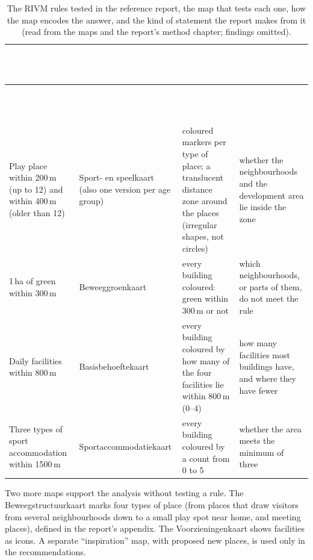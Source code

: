 \begingroup\renewcommand{\arraystretch}{1.3}
\begin{longtable}{|>{\raggedright\arraybackslash}p{3.3cm}|>{\raggedright\arraybackslash}p{2.9cm}|>{\raggedright\arraybackslash}p{4.4cm}|>{\raggedright\arraybackslash}p{3.6cm}|}
\caption{The RIVM rules tested in the reference report, the map that tests each one, how the map encodes the answer, and the kind of statement the report makes from it (read from the maps and the report's method chapter; findings omitted).}\label{tab:rules-maps}\\
\hline
\cellcolor{navy}\textcolor{white}{\textbf{RIVM rule}} & \cellcolor{navy}\textcolor{white}{\textbf{Map}} & \cellcolor{navy}\textcolor{white}{\textbf{How the map encodes it}} & \cellcolor{navy}\textcolor{white}{\textbf{Kind of statement in the report}} \\ \hline
\endfirsthead
\hline
\cellcolor{navy}\textcolor{white}{\textbf{RIVM rule}} & \cellcolor{navy}\textcolor{white}{\textbf{Map}} & \cellcolor{navy}\textcolor{white}{\textbf{How the map encodes it}} & \cellcolor{navy}\textcolor{white}{\textbf{Kind of statement in the report}} \\ \hline
\endhead
Play place within 200\,m (up to 12) and within 400\,m (older than 12) & Sport- en speelkaart (also one version per age group) & coloured markers per type of place; a translucent distance zone around the places (irregular shapes, not circles) & whether the neighbourhoods and the development area lie inside the zone \\ \hline
\rowcolor{light}
1\,ha of green within 300\,m & Beweeg\-groen\-kaart & every building coloured: green within 300\,m or not & which neighbourhoods, or parts of them, do not meet the rule \\ \hline
Daily facilities within 800\,m & Basis\-behoefte\-kaart & every building coloured by how many of the four facilities lie within 800\,m (0--4) & how many facilities most buildings have, and where they have fewer \\ \hline
\rowcolor{light}
Three types of sport accommodation within 1500\,m & Sport\-accommodatie\-kaart & every building coloured by a count from 0 to 5 & whether the area meets the minimum of three \\ \hline
\end{longtable}
\endgroup

Two more maps support the analysis without testing a rule. The Beweegstructuurkaart marks four types of place (from places that draw visitors from several neighbourhoods down to a small play spot near home, and meeting places), defined in the report's appendix. The Voorzieningenkaart shows facilities as icons. A separate \textquotedblleft{}inspiration\textquotedblright{} map, with proposed new places, is used only in the recommendations.

